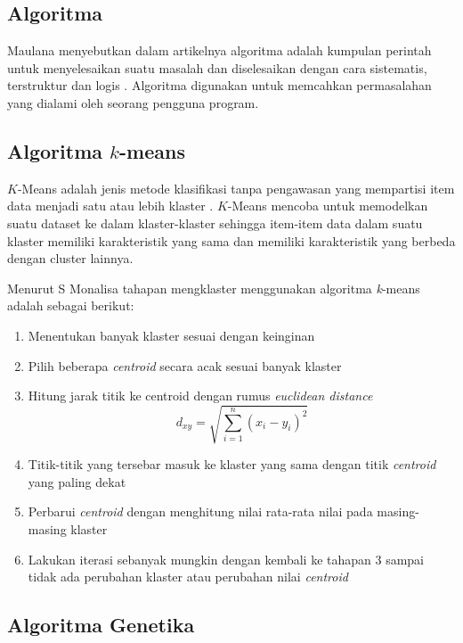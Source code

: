 \subsection{Algoritma}

Maulana menyebutkan dalam artikelnya algoritma adalah kumpulan perintah untuk menyelesaikan suatu masalah dan diselesaikan dengan cara sistematis, terstruktur dan logis \cite{maulana2017pembelajaran}. Algoritma digunakan untuk memcahkan permasalahan yang dialami oleh seorang pengguna program.

\subsection{Algoritma $k$-means}

$K$-Means adalah jenis metode klasifikasi tanpa pengawasan yang mempartisi item data menjadi satu atau lebih klaster \cite{agusta2007k}. $K$-Means mencoba untuk memodelkan suatu dataset ke dalam klaster-klaster sehingga item-item data dalam suatu klaster memiliki karakteristik yang sama dan memiliki karakteristik yang berbeda dengan cluster lainnya.

Menurut S Monalisa \cite{monalisa2018klasterisasi} tahapan mengklaster menggunakan algoritma \textit{k}-means adalah sebagai berikut:

\begin{enumerate}
	\item Menentukan banyak klaster sesuai dengan keinginan
	\item Pilih beberapa \textit{centroid} secara acak sesuai banyak klaster
	\item Hitung jarak titik ke centroid dengan rumus \textit{euclidean distance}
	\begin{equation}
	d_{xy}=\sqrt{\sum_{i=1}^{n}(x_i-y_i)^{2}}
	\label{eq:euclidean}
	\end{equation}
	\item Titik-titik yang tersebar masuk ke klaster yang sama dengan titik \textit{centroid} yang paling dekat
	\item Perbarui \textit{centroid} dengan menghitung nilai rata-rata nilai pada masing-masing klaster
	\item Lakukan iterasi sebanyak mungkin dengan kembali ke tahapan 3 sampai tidak ada perubahan klaster atau perubahan nilai \textit{centroid}
\end{enumerate}


\subsection{Algoritma Genetika}

